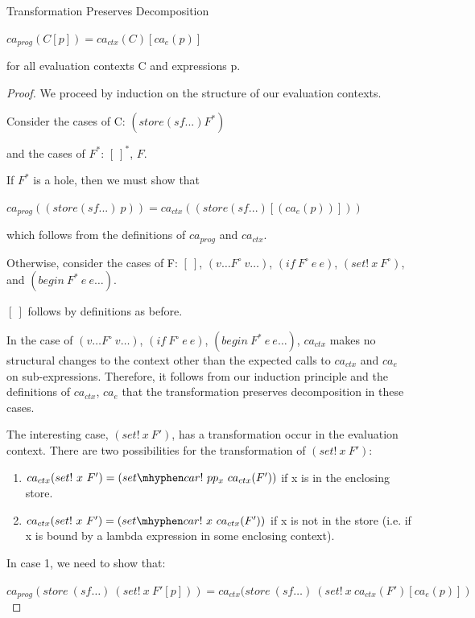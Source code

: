 \begin{lemma}\label{lem:trans_decomp} Transformation Preserves Decomposition

$ca_{prog}(C[p]) = ca_{ctx}(C)[ca_e(p)]$

for all evaluation contexts C and expressions p.

\end{lemma}
\begin{proof} We proceed by induction on the structure of our evaluation contexts.

Consider the cases of C: $(store (sf ...) F^{*})$

and the cases of $F^{*}$: $[\ ]^{*}$, $F$.

If $F^{*}$ is a hole, then we must show that 

$ca_{prog}((store (sf ...)\ p)) = ca_{ctx}((store (sf ...) [(ca_{e}(p))]))$

which follows from the definitions of $ca_{prog}$ and $ca_{ctx}$.

Otherwise, consider the cases of F: $[\ ]$, $(v \dots F^{\circ}\ v \dots)$, $(if\ F^{\circ}\ e\ e)$, $(set!\ x\ F^{\circ})$, and $(begin\ F^{*}\ e\ e \dots)$.

$[\ ]$ follows by definitions as before. 

In the case of  $(v \dots F^{\circ}\ v \dots)$, $(if\ F^{\circ}\ e\ e)$, $(begin\ F^{*}\ e\ e \dots)$, $ca_{ctx}$ makes no structural changes to the context other than the expected calls to $ca_{ctx}$ and $ca_e$ on sub-expressions. Therefore, it follows from our induction principle and the definitions of $ca_{ctx}$, $ca_e$ that the transformation preserves decomposition in these cases.

The interesting case, $(set!\ x\ F')$, has a transformation occur in the evaluation context. There are two possibilities for the transformation of $(set!\ x\ F')$:

\begin{enumerate}
    \item $ca_{ctx}(set!\ x\ F') = (set \mhyphen car!\ pp_x\ ca_{ctx}(F'))$ if x is in the enclosing store.
    \item $ca_{ctx}(set!\ x\ F') = (set \mhyphen car!\ x\ ca_{ctx}(F'))$ if x is not in the store (i.e. if x is bound by a lambda expression in some enclosing context).
\end{enumerate}

In case 1, we need to show that:

$ca_{prog}(store\ (sf \dots)\ (set!\ x\ F'[p])) = ca_{ctx}(store\ (sf \dots)\ (set!\ x\ ca_{ctx}(F')[ca_e(p)])$


\end{proof}

